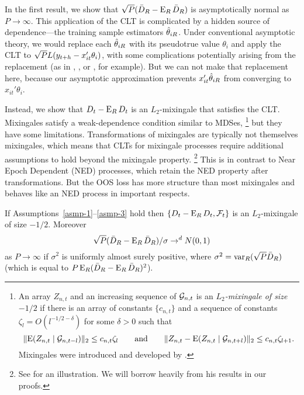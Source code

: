 \documentclass[12pt]{article}
\begin{document}
In the first result, we show that
$\sqrt{P} (\bar{D}_{R} - \operatorname{E}_R \bar{D}_{R})$ is asymptotically normal as $P \to
\infty$. This application of the CLT is complicated by a hidden source
of dependence---the training sample estimators $\hat\theta_{iR}$. Under
conventional asymptotic theory, we would replace each $\hat\theta_{iR}$ with
its pseudotrue value $\theta_i$ and apply the CLT to $\sqrt{P}
L(y_{t+h} - x_{it}'\theta_i)$, with some complications potentially
arising from the replacement (as in \citealp{Wes:96},
\citealp{ClM:01}, or \citealp{Mcc:07}, for example). But we can not
make that replacement here, because our asymptotic approximation
prevents $x_{it}'\hat\theta_{iR}$ from converging to $x_{it}'\theta_i$.

Instead, we show that $D_t - \operatorname{E}_R D_t$ is an $L_2$-mixingale that
satisfies the CLT. Mixingales satisfy a weak-dependence condition
similar to MDSes,%
\footnote{An array $Z_{n,t}$ and an increasing sequence of \sfields
  $\mathcal{G}_{n,t}$ is an \emph{$L_2$-mixingale of size $-1/2$} if there is
  an array of constants $\{c_{n,t}\}$ and a sequence of constants
  $\zeta_l = O(l^{-1/2 - \delta})$ for some $\delta > 0$ such that
  \begin{equation*}
    \lVert \operatorname{E}(Z_{n,t} \mid \mathcal{G}_{n,t-l}) \rVert_2
    \leq c_{n,t} \zeta_l
    \qquad\text{and}\qquad
    \lVert Z_{n,t} - \operatorname{E}(Z_{n,t} \mid \mathcal{G}_{n,t+l}) \rVert_2
    \leq c_{n,t} \zeta_{l+1}.
  \end{equation*}
  Mixingales were introduced and developed by
  \citet{Mcl:74,Mcl:75,Mcl:75b,Mcl:77}.} %
but they have some limitations. Transformations of mixingales are
typically not themselves mixingales, which means that CLTs for
mixingale processes require additional assumptions to hold beyond the
mixingale property.%
\footnote{See \citet{Jon:97} for an illustration. We will borrow
  heavily from his results in our proofs.} %
This is in contrast to Near Epoch Dependent (NED) processes, which
retain the NED property after transformations. \citep[See chapter 17
of][for further discussion of these properties.]{Dav:94} But the OOS
loss has more structure than most mixingales and behaves like an NED
process in important respects.

\begin{lem}\label{res-mixingale}
  If Assumptions~\ref{asmp-1}--\ref{asmp-3} hold then $\{D_t - \operatorname{E}_R
  D_t, \mathcal F_t\}$ is an $L_2$-mixingale of size $-1/2$.
  Moreover
  \begin{equation}\label{normalpart}
    \sqrt{P}(\bar{D}_{R} - \operatorname{E}_R \bar{D}_{R})/\sigma \to^d N(0,1)
  \end{equation}
  as $P \to \infty$ if $\sigma^2$ is uniformly almost surely positive,
  where $\sigma^2 = \operatorname{var}_R(\sqrt{P} \bar{D}_{R})$ (which is equal to $P
  \operatorname{E}_R(\bar{D}_R - \operatorname{E}_R \bar{D}_R)^2$).
\end{lem}
\end{document}
